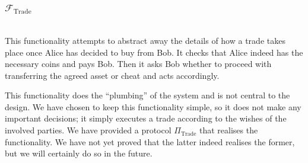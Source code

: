 \subsubsection{$\mathcal{F}_{\mathrm{Trade}}$} \ \\[0.5\baselineskip]
  This functionality attempts to abstract away the details of how a trade takes place once
  Alice has decided to buy from Bob. It checks that Alice indeed has the necessary coins
  and pays Bob. Then it asks Bob whether to proceed with transferring the agreed asset or
  cheat and acts accordingly.

  This functionality does the ``plumbing'' of the system and is not central to the design.
  We have chosen to keep this functionality simple, so it does not make any important
  decisions; it simply executes a trade according to the wishes of the involved parties.
  We have provided a protocol $\Pi_{\mathrm{Trade}}$ that realises the functionality. We
  have not yet proved that the latter indeed realises the former, but we will certainly do
  so in the future.
